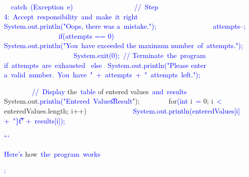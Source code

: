 \documentclass{article}
\begin{document}
\begin{tcolorbox}[colframe=black,colback=white]
{{{{{}           \textcolor{blue}{~}}\textcolor{blue}{~catch}\textcolor{blue}{~(}\textcolor{blue}{Exception}\textcolor{blue}{~e}\textcolor{blue}{)}\textcolor{blue}{~{
}\textcolor{blue}{~~~~~~~~~~~~~~~}\textcolor{blue}{~//}\textcolor{blue}{~Step} \textcolor{blue}{4}:\textcolor{blue}{~Accept}\textcolor{blue}{~responsibility}\textcolor{blue}{~and}\textcolor{blue}{~make}\textcolor{blue}{~it}\textcolor{blue}{~right}
\textcolor{blue}{~~~~~~~~~~~~~~~} System.out.println("Oops, there was a\textcolor{blue}{~mistake}.");
\textcolor{blue}{~~~~~~~~~~~~~~~} attempts--;
\textcolor{blue}{~~~~~~~~~~~~~~~} if\textcolor{blue}{(at}tempts == 0)\textcolor{blue}{~{
}\textcolor{blue}{~~~~~~~~~~~~~~~~~~~} System\textcolor{blue}{.out}\textcolor{blue}{.println}("You\textcolor{blue}{~have} exceeded the maximum number\textcolor{blue}{~of}\textcolor{blue}{~attempts}.");
\textcolor{blue}{~~~~~~~~~~~~~~~~~~~}\textcolor{blue}{~System}.exit\textcolor{blue}{(}0);\textcolor{blue}{~//} Ter\textcolor{blue}{minate}\textcolor{blue}{~the}\textcolor{blue}{~program} if\textcolor{blue}{~attempts}\textcolor{blue}{~are}\textcolor{blue}{~exhausted}
                }\textcolor{blue}{~else}\textcolor{blue}{~{
}                    System.out\textcolor{blue}{.println}("Please enter a\textcolor{blue}{~valid}\textcolor{blue}{~number}\textcolor{blue}{.}\textcolor{blue}{~You}\textcolor{blue}{~have}\textcolor{blue}{~"}\textcolor{blue}{~+}\textcolor{blue}{~attempts}\textcolor{blue}{~+}\textcolor{blue}{~"}\textcolor{blue}{~attempts}\textcolor{blue}{~left}.");
                }
            }
       \textcolor{blue}{~}

}\textcolor{blue}{~~~~~~~}\textcolor{blue}{~//}\textcolor{blue}{~Display} the\textcolor{blue}{~table} of entered values\textcolor{blue}{~and}\textcolor{blue}{~results}\textcolor{blue}{
}\textcolor{blue}{~~~~~~~} System.out\textcolor{blue}{.println}\textcolor{blue}{("}\textcolor{blue}{Entered}\textcolor{blue}{~Values}\textcolor{blue}{\t}\textcolor{blue}{Result}");
\textcolor{blue}{~~~~~~~} for\textcolor{blue}{(int} i\textcolor{blue}{~=} 0; i\textcolor{blue}{~<} enteredValues.length; i++)\textcolor{blue}{~{
}\textcolor{blue}{~~~~~~~~~~~} System.out\textcolor{blue}{.println}(\textcolor{blue}{entered}Values[i] +\textcolor{blue}{~"\}t\textcolor{blue}{\t}\textcolor{blue}{"} +\textcolor{blue}{~results}[i]);
        }
    }
\textcolor{blue}{}
}\textcolor{blue}{```}\textcolor{blue}{

}\textcolor{blue}{Here}\textcolor{blue}{'s} how\textcolor{blue}{~the}\textcolor{blue}{~program}\textcolor{blue}{~works}\textcolor{blue}{:

}}
\end{tcolorbox}
\end{document}
